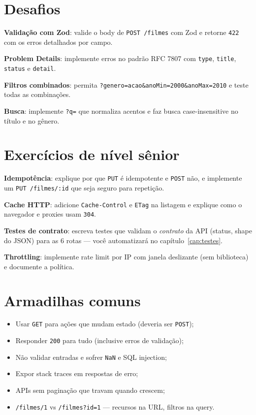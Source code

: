 \section{Desafios}

\begin{desafios}
  \item \textbf{Validação com Zod}: valide o body de \texttt{POST /filmes} com Zod e retorne \texttt{422} com os erros detalhados por campo.
  \item \textbf{Problem Details}: implemente erros no padrão RFC 7807 com \texttt{type}, \texttt{title}, \texttt{status} e \texttt{detail}.
  \item \textbf{Filtros combinados}: permita \texttt{?genero=acao\&anoMin=2000\&anoMax=2010} e teste todas as combinações.
  \item \textbf{Busca}: implemente \texttt{?q=} que normaliza acentos e faz busca case-insensitive no título e no gênero.
\end{desafios}

\section{Exercícios de nível sênior}

\begin{seniores}
  \item \textbf{Idempotência}: explique por que \texttt{PUT} é idempotente e \texttt{POST} não, e implemente um \texttt{PUT /filmes/:id} que seja seguro para repetição.
  \item \textbf{Cache HTTP}: adicione \texttt{Cache-Control} e \texttt{ETag} na listagem e explique como o navegador e proxies usam \texttt{304}.
  \item \textbf{Testes de contrato}: escreva testes que validam o \emph{contrato} da API (status, shape do JSON) para as 6 rotas — você automatizará no capítulo~\ref{cap:testes}.
  \item \textbf{Throttling}: implemente rate limit por IP com janela deslizante (sem biblioteca) e documente a política.
\end{seniores}

\section{Armadilhas comuns}

\begin{itemize}[leftmargin=*, itemsep=0.4em]
  \item Usar \texttt{GET} para ações que mudam estado (deveria ser \texttt{POST});
  \item Responder \texttt{200} para tudo (inclusive erros de validação);
  \item Não validar entradas e sofrer \texttt{NaN} e SQL injection;
  \item Expor stack traces em respostas de erro;
  \item APIs sem paginação que travam quando crescem;
  \item \texttt{/filmes/1} vs \texttt{/filmes?id=1} — recursos na URL, filtros na query.
\end{itemize}

